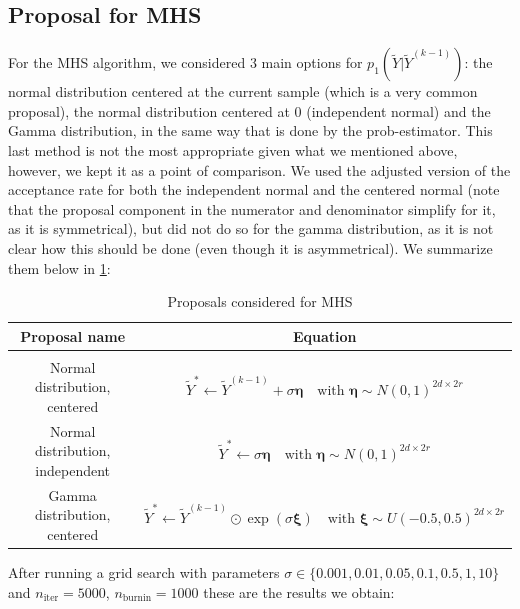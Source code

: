 \documentclass[12pt]{memoir}
\newcommand{\nitern}[1]{$n_{\text{iter}}=#1$}
\newcommand{\nburninn}[1]{$n_{\text{burnin}}=#1$}
\begin{document}
\subsection*{Proposal for MHS}
For the MHS algorithm, we considered 3 main options for $p_1(\tilde Y| \tilde Y ^{(k-1)})$: the normal distribution centered at the current sample (which is a very common proposal), the normal distribution centered at 0 (independent normal) and the Gamma distribution, in the same way that is done by the prob-estimator. This last method is not the most appropriate given what we mentioned above, however, we kept it as a point of comparison. We used the adjusted version of the acceptance rate for both the independent normal and the centered normal (note that the proposal component in the numerator and denominator simplify for it, as it is symmetrical), but did not do so for the gamma distribution, as it is not clear how this should be done (even though it is asymmetrical). We summarize them below in \ref{table:proposal-comp-mhs}:
\begin{table}[H]

    \begin{center}
        \begin{tabular}{|c|c|}
            \hline
            Proposal name & Equation\\
            \hline\hline
             & \\[-10pt]
            Normal distribution, centered & $\tilde Y^* \gets \tilde Y^{(k-1)} + \sigma \boldsymbol{\eta} \quad\text{with } \boldsymbol{\eta} \sim N(0,1)^{2d\times 2r}$\\
            Normal distribution, independent & $\tilde Y^* \gets \sigma \boldsymbol{\eta} \quad\text{with } \boldsymbol{\eta} \sim N(0, 1)^{2d \times 2r}$\\
            Gamma distribution, centered & $\tilde Y^* \gets \tilde Y^{(k-1)} \odot \exp (\sigma\boldsymbol{\xi})\quad \text{with } \boldsymbol{\xi} \sim U(-0.5, 0.5)^{2d\times 2r}$\\\hline
        \end{tabular}
\end{center}
\caption{Proposals considered for MHS}
\label{table:proposal-comp-mhs}
\end{table}

After running a grid search with parameters $\sigma\in \{0.001, 0.01, 0.05, 0.1, 0.5, 1, 10\}$ and \nitern{5000}, \nburninn{1000} these are the results we obtain: 
\end{document}
